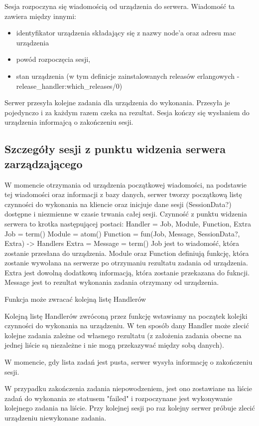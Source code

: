 \documentclass[polish,12pt]{aghthesis}
\begin{document}
Sesja rozpoczyna się wiadomością od urządzenia do serwera. Wiadomość ta zawiera między innymi:
\begin{itemize}
\item identyfikator urządzenia składający się z nazwy node'a oraz adresu mac urządzenia
\item powód rozpoczęcia sesji,
\item stan urządzenia (w tym definicje zainstalowanych releasów erlangowych - release\_handler:which\_releases/0)
\end{itemize}
Serwer przesyła kolejne zadania dla urządzenia do wykonania. Przesyła je pojedynczo i za każdym razem czeka na rezultat. Sesja kończy się wysłaniem do urządzenia informajcą o zakończeniu sesji.

\subsection{Szczegóły sesji z punktu widzenia serwera zarządzającego}
W momencie otrzymania od urządzenia początkowej wiadomości, na podstawie tej wiadomości oraz informacji z bazy danych, serwer tworzy początkową listę czynności do wykonania na kliencie oraz inicjuje dane sesji (SessionData?) dostępne i niezmienne w czasie trwania całej sesji. Czynność z punktu widzenia serwera to krotka następującej postaci: Handler = {Job, Module, Function, Extra} Job = term() Module = atom() Function = fun(Job, Message, SessionData?, Extra) -> Handlers Extra = Message = term() Job jest to wiadomość, która zostanie przesłana do urządzenia. Module oraz Function definiują funkcję, która zostanie wywołana na serwerze po otrzymaniu rezultatu zadania od urządzenia. Extra jest dowolną dodatkową informacją, która zostanie przekazana do fukncji. Message jest to rezultat wykonania zadania otrzymany od urządzenia.

Funkcja może zwracać kolejną listę Handlerów

Kolejną listę Handlerów zwróconą przez funkcję wstawiamy na początek kolejki czynności do wykonania na urządzeniu. W ten sposób dany Handler może zlecić kolejne zadania zależne od własnego rezultatu (z założenia zadania obecne na jednej liście są niezależne i nie mogą przekazywać między sobą danych).

W momencie, gdy lista zadań jest pusta, serwer wysyła informację o zakończeniu sesji.

W przypadku zakończenia zadania niepowodzeniem, jest ono zostawiane na liście zadań do wykonania ze statusem "failed" i rozpoczynane jest wykonywanie kolejnego zadania na liście. Przy kolejnej sesji po raz kolejny serwer próbuje zlecić urządzeniu niewykonane zadania.
\end{document}
